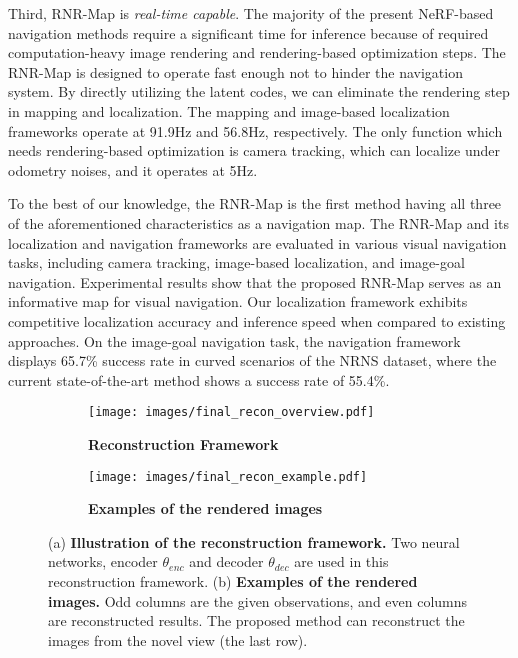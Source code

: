 \documentclass[10pt,twocolumn,letterpaper]{article}
\def\proposed{RNR-Map\xspace}
\begin{document}
Third, \proposed  is \textit{real-time capable}. 
The majority of the present NeRF-based navigation methods require a significant time for inference because of required computation-heavy image rendering and rendering-based optimization steps.
%
The \proposed is designed to operate fast enough not to hinder the navigation system.
%
By directly utilizing the latent codes, we can eliminate the rendering step in mapping and localization. 
%
The mapping and image-based localization frameworks operate at 91.9Hz and 56.8Hz, respectively.
%
The only function which needs rendering-based optimization is camera tracking, which can localize under odometry noises, and it operates at 5Hz.
%

To the best of our knowledge, the \proposed is the first method having all three of the aforementioned characteristics as a navigation map.
%
The \proposed and its localization and navigation frameworks are evaluated in various visual navigation tasks, including camera tracking, image-based localization, and image-goal navigation.
%
Experimental results show that the proposed \proposed serves as an informative map for visual navigation. 
%
Our localization framework exhibits competitive localization accuracy and inference speed when compared to existing approaches.
%
On the image-goal navigation task, the navigation framework displays 65.7\% success rate in curved scenarios of the NRNS\cite{NRNS} dataset, where the current state-of-the-art method\cite{SLING} shows a success rate of 55.4\%.

\begin{figure*}[t]
\centering
\begin{subfigure}{0.73\textwidth}
\texttt{[image: images/final\_recon\_overview.pdf]}
\caption{\textbf{Reconstruction Framework}}
\label{fig:recon_overview}
\end{subfigure}%
\begin{subfigure}{0.269\textwidth}
  \texttt{[image: images/final\_recon\_example.pdf]}
  \caption{\textbf{Examples of the rendered images}}
\label{fig:recon_random}
\end{subfigure}
  \vspace{-0.5cm}
  \caption{(a) \textbf{Illustration of the reconstruction framework.} Two neural networks, encoder $\theta_{enc}$ and decoder $\theta_{dec}$ are used in this reconstruction framework.  (b) \textbf{Examples of the rendered images.} Odd columns are the given observations, and even columns are reconstructed results. The proposed method can reconstruct the images from the novel view (the last row).}
  \vspace{-0.5cm}
\end{figure*}
\end{document}
